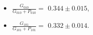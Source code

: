 \begin{itemize}
  \item $\frac{G_{010}}{G_{010} + P_{010}} =$ $0.344 \pm 0.015$,
  \item $\frac{G_{101}}{G_{101} + P_{101}} =$ $0.332 \pm 0.014$.
\end{itemize}

